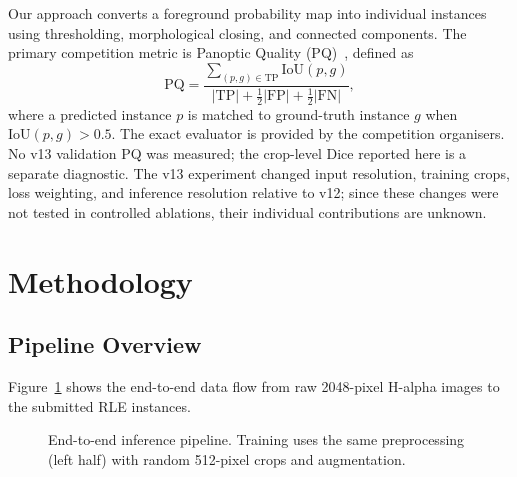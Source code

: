 \documentclass[sigconf]{acmart}
\begin{document}
Our approach converts a foreground probability map into individual instances using thresholding, morphological closing, and connected components. The primary competition metric is Panoptic Quality (PQ)~\cite{kirillov2019panoptic}, defined as
\begin{equation}
\mathrm{PQ} = \frac{\sum_{(p,g)\in\mathrm{TP}} \mathrm{IoU}(p,g)}{|\mathrm{TP}| + \tfrac{1}{2}|\mathrm{FP}| + \tfrac{1}{2}|\mathrm{FN}|},
\end{equation}
where a predicted instance $p$ is matched to ground-truth instance $g$ when $\mathrm{IoU}(p,g)>0.5$. The exact evaluator is provided by the competition organisers. No v13 validation PQ was measured; the crop-level Dice reported here is a separate diagnostic. The v13 experiment changed input resolution, training crops, loss weighting, and inference resolution relative to v12; since these changes were not tested in controlled ablations, their individual contributions are unknown.

\section{Methodology}

\subsection{Pipeline Overview}

Figure~\ref{fig:pipeline} shows the end-to-end data flow from raw
2048-pixel H-alpha images to the submitted RLE instances.

\begin{figure}[h]
\centering
{}
\caption{End-to-end inference pipeline. Training uses the same
preprocessing (left half) with random 512-pixel crops and
augmentation.}
\label{fig:pipeline}
\end{figure}
\end{document}
